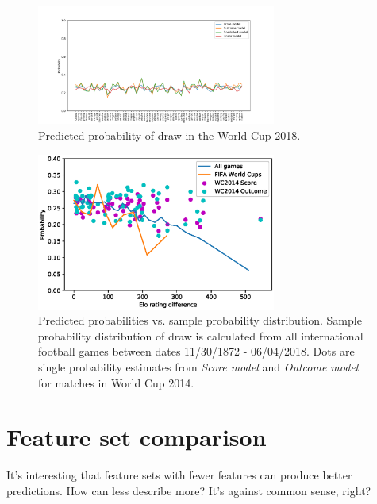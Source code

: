 \begin{figure}[H]
    \centering
    \includegraphics[width=0.7\textwidth]{img/match_level_2018_model_probability_draw_prob.png}
    \caption{Predicted probability of draw in the World Cup 2018.}
    \label{fig:draw_probability}
\end{figure}

\begin{figure}[H]
    \centering
    \includegraphics[width=0.7\textwidth]{img/draw_true_probability_wc.eps}
    \caption{Predicted probabilities vs. sample probability distribution. Sample probability distribution of draw is calculated from all international football games between dates 11/30/1872 - 06/04/2018. Dots are single probability estimates from \textit{Score model} and \textit{Outcome model} for matches in World Cup 2014.}
    \label{fig:draw_prob_dist}
\end{figure}

\section{Feature set comparison}
It's interesting that feature sets with fewer features can produce better predictions. How can less describe more? It's against common sense, right?

